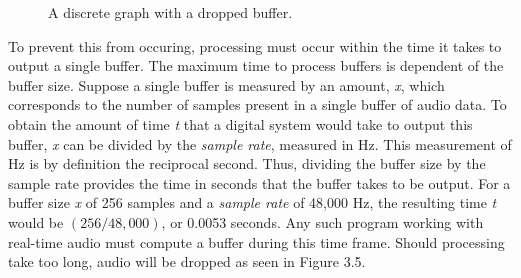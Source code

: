 \begin{figure}[h] %
	\begin{center}
		\caption{A discrete graph with a dropped buffer.}
	\end{center}
\end{figure}

To prevent this from occuring, processing must occur within the time it takes to output a single buffer. The maximum time to process buffers is dependent of the buffer size. Suppose a single buffer is measured by an amount, \textit{x}, which corresponds to the number of samples present in a single buffer of audio data. To obtain the amount of time \textit{t} that a digital system would take to output this buffer, \textit{x} can be divided by the \textit{sample rate}, measured in Hz. This measurement of Hz is by definition the reciprocal second. Thus, dividing the buffer size by the sample rate provides the time in seconds that the buffer takes to be output. For a buffer size \textit{x} of 256 samples and a \textit{sample rate} of 48,000 Hz, the resulting time \textit{t} would be $(256 / 48,000)$, or 0.0053 seconds. Any such program working with real-time audio must compute a buffer during this time frame. Should processing take too long, audio will be dropped as seen in Figure 3.5.

